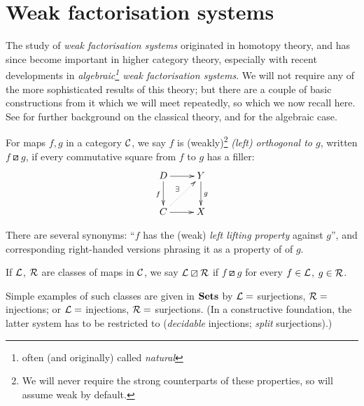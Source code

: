 \section{Weak factorisation systems} \label{sec:wfs-bgd}

The study of \emph{weak factorisation systems} originated in homotopy theory, and has since become important in higher category theory, especially with recent developments in \emph{algebraic\footnote{often (and originally) called \emph{natural}} weak factorisation systems}.  We will not require any of the more sophisticated results of this theory; but there are a couple of basic constructions from it which we will meet repeatedly, so which we now recall here.  See \cite[Ch.~1]{hovey:book} for further background on the classical theory, and \cite{garner:understanding} for the algebraic case.

\begin{definition}For maps $f, g$ in a category $\mathcal{C}$, we say $f$ is (weakly)\footnote{We will never require the strong counterparts of these properties, so will assume weak by default.} \emph{(left) orthogonal to $g$}, written \emph{$f \boxslash g$}, if every commutative square from $f$ to $g$ has a filler:
\[\xymatrix{D \ar[r] \ar[d]_f & Y \ar[d]^g \\ C \ar[r] \ar@{..>}[ur]^\exists & X}\]

There are several synonyms: ``$f$ has the (weak) \emph{left lifting property} against $g$'', and corresponding right-handed versions phrasing it as a property of of $g$. 

If $\mathcal{L}$, $\mathcal{R}$ are classes of maps in $\mathcal{C}$, we say $\mathcal{L} \boxslash \mathcal{R}$ if $f \boxslash g$ for every $f \in \mathcal{L}$, $g \in \mathcal{R}$.
\end{definition}

Simple examples of such classes are given in $\mathbf{Sets}$ by $\mathcal{L} =$ surjections, $\mathcal{R} =$ injections; or $\mathcal{L} =$ injections, $\mathcal{R} = $ surjections.  (In a constructive foundation, the latter system has to be restricted to (\emph{decidable} injections; \emph{split} surjections).)

